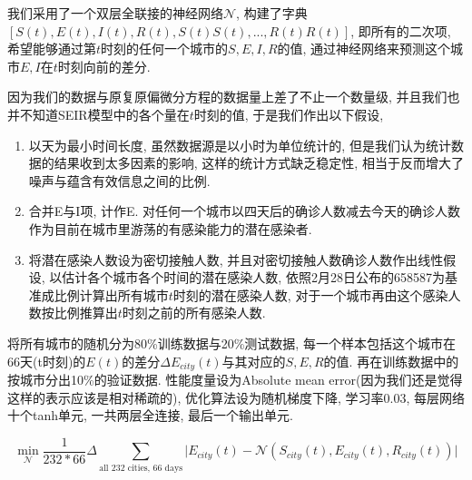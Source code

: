 \documentclass[lang=cn,11pt]{elegantpaper}
\begin{document}
我们采用了一个双层全联接的神经网络$\mathcal N$, 构建了字典$[S(t),E(t),I(t),R(t),S(t)S(t),...,R(t)R(t)]$, 即所有的二次项, 希望能够通过第$t$时刻的任何一个城市的$S,E,I,R$的值, 通过神经网络来预测这个城市$E,I$在$t$时刻向前的差分. 

因为我们的数据与原复原偏微分方程的数据量上差了不止一个数量级, 并且我们也并不知道SEIR模型中的各个量在$t$时刻的值, 于是我们作出以下假设, 
\begin{enumerate}
	\item 以天为最小时间长度, 虽然数据源是以小时为单位统计的, 但是我们认为统计数据的结果收到太多因素的影响, 这样的统计方式缺乏稳定性, 相当于反而增大了噪声与蕴含有效信息之间的比例.
	\item 合并E与I项, 计作E. 对任何一个城市以四天后的确诊人数减去今天的确诊人数作为目前在城市里游荡的有感染能力的潜在感染者.
	\item 将潜在感染人数设为密切接触人数, 并且对密切接触人数确诊人数作出线性假设, 以估计各个城市各个时间的潜在感染人数, 依照2月28日公布的658587为基准成比例计算出所有城市$t$时刻的潜在感染人数, 对于一个城市再由这个感染人数按比例推算出$t$时刻之前的所有感染人数. 
\end{enumerate}

将所有城市的随机分为80\%训练数据与20\%测试数据, 每一个样本包括这个城市在66天(t时刻)的$E(t)$的差分$\Delta E_{city}(t)$与其对应的$S,E,R$的值. 再在训练数据中的按城市分出10\%的验证数据. 性能度量设为Absolute mean error(因为我们还是觉得这样的表示应该是相对稀疏的), 优化算法设为随机梯度下降, 学习率0.03, 每层网络十个tanh单元, 一共两层全连接, 最后一个输出单元.

\begin{equation}
	\min_{\mathcal N} \dfrac{1}{232*66}\Delta \sum_{\text{all 232 cities, 66 days}}\Big|E_{city}(t)-\mathcal N(S_{city}(t),E_{city}(t),R_{city}(t))\Big|
\end{equation}



\newpage
\nocite{*}



\end{document}
